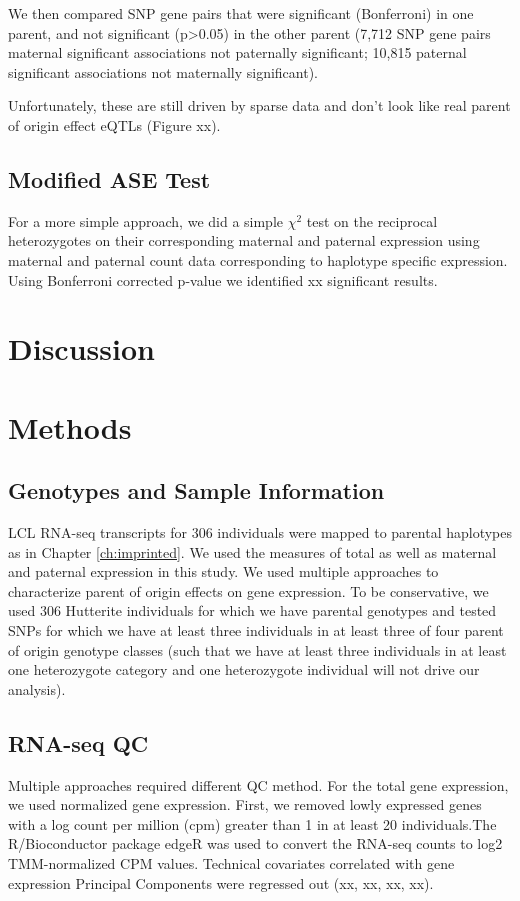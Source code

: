 We then compared SNP gene pairs that were significant (Bonferroni) in one parent, and not significant (p>0.05) in the other parent (7,712 SNP gene pairs maternal significant associations not paternally significant; 10,815 paternal significant associations not maternally significant). 

Unfortunately, these are still driven by sparse data and don't look like real parent of origin effect eQTLs (Figure xx).

\subsection{Modified ASE Test}\label{Modified ASE Test} 

For a more simple approach, we did a simple $\chi^2$ test on the reciprocal heterozygotes on their corresponding maternal and paternal expression using maternal and paternal count data corresponding to haplotype specific expression. 
Using Bonferroni corrected p-value we identified xx significant results. 


\section{Discussion}\label{ch04-discussion}



\section{Methods}\label{ch04-methods}

\subsection{Genotypes and Sample Information}\label{Genotypes and Sample Information}
LCL RNA-seq transcripts for 306 individuals were mapped to parental haplotypes as in Chapter \ref{ch:imprinted}. We used the measures of total as well as maternal and paternal expression in this study. We used multiple approaches to characterize parent of origin effects on gene expression.
To be conservative, we used 306 Hutterite individuals for which we have parental genotypes and tested SNPs for which we have at least three individuals in at least three of four parent of origin genotype classes (such that we have at least three individuals in at least one heterozygote category and one heterozygote individual will not drive our analysis).

\subsection{RNA-seq QC}\label{RNA-seq QC}
Multiple approaches required different QC method. For the total gene expression, we used normalized gene expression. First, we removed lowly expressed genes with a log count per million (cpm) greater than 1 in at least 20 individuals.The R/Bioconductor package edgeR was used to convert the RNA-seq counts to log2 TMM-normalized CPM values\cite{Robinson:2010dd,Robinson:2010cw}. Technical covariates correlated with gene expression Principal Components were regressed out (xx, xx, xx, xx). 

